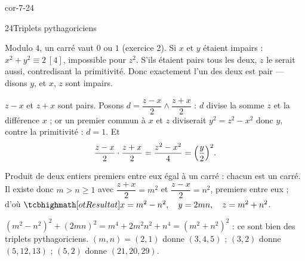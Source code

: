 \begin{blocLivre}{cor-7-24}
\begin{corrige}{24}{Triplets pythagoriciens}
\begin{questions}
  \item Modulo $4$, un carré vaut $0$ ou $1$ (exercice 2). Si $x$ et $y$
    étaient impairs : $x^{2}+y^{2}\equiv2\ [4]$, impossible pour $z^{2}$.
    S'ils étaient pairs tous les deux, $z$ le serait aussi, contredisant la
    primitivité. Donc exactement l'un des deux est pair — disons $y$, et
    $x$, $z$ sont impairs.
  \item $z-x$ et $z+x$ sont pairs. Posons
    $d=\dfrac{z-x}{2}\wedge\dfrac{z+x}{2}$ : $d$ divise la somme $z$ et la
    différence $x$ ; or un premier commun à $x$ et $z$ diviserait
    $y^{2}=z^{2}-x^{2}$ donc $y$, contre la primitivité : $d=1$. Et
    \[
      \frac{z-x}{2}\cdot\frac{z+x}{2}=\frac{z^{2}-x^{2}}{4}
      =\Bigl(\frac{y}{2}\Bigr)^{2}.
    \]
  \item Produit de deux entiers premiers entre eux égal à un carré :
    chacun est un carré. Il existe donc $m>n\geq1$ avec
    $\dfrac{z+x}{2}=m^{2}$ et $\dfrac{z-x}{2}=n^{2}$, premiers entre eux ;
    d'où $\res{x=m^{2}-n^{2},\quad y=2mn,\quad z=m^{2}+n^{2}}$.
  \item $(m^{2}-n^{2})^{2}+(2mn)^{2}=m^{4}+2m^{2}n^{2}+n^{4}
    =(m^{2}+n^{2})^{2}$ : ce sont bien des triplets pythagoriciens.
    $(m,n)=(2,1)$ donne $(3,4,5)$ ; $(3,2)$ donne $(5,12,13)$ ; $(5,2)$
    donne $(21,20,29)$.
\end{questions}
\end{corrige}
\end{blocLivre}


